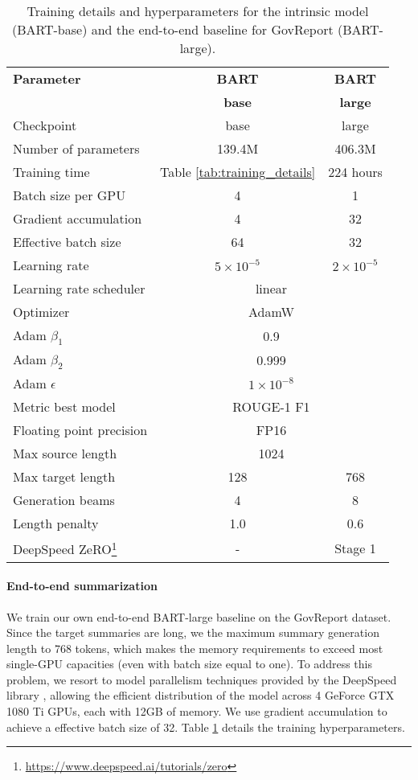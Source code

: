 \documentclass[11pt,table]{article}
\begin{document}
\begin{table}
  \centering
  \setlength\tabcolsep{2.9pt}
  \begin{tabular}{lcc}
    \toprule
    \textbf{Parameter} & \textbf{BART} & \textbf{BART} \\
     & \textbf{base} & \textbf{large} \\
    \midrule
    Checkpoint & base & large \\
    Number of parameters & 139.4M & 406.3M \\
    Training time & Table \ref{tab:training_details} & 224 hours \\
    Batch size per GPU & 4 & 1 \\
    Gradient accumulation & 4 & 32 \\
    Effective batch size & 64 & 32 \\
    Learning rate & $5 \times 10^{-5}$ & $2 \times 10^{-5}$ \\
    Learning rate scheduler & \multicolumn{2}{c}{linear} \\
    Optimizer & \multicolumn{2}{c}{AdamW} \\
    Adam $\beta_1$ & \multicolumn{2}{c}{0.9} \\
    Adam $\beta_2$ & \multicolumn{2}{c}{0.999} \\
    Adam $\epsilon$ & \multicolumn{2}{c}{$1 \times 10^{-8}$} \\
    Metric best model & \multicolumn{2}{c}{ROUGE-1 F1} \\
    Floating point precision & \multicolumn{2}{c}{FP16} \\
    Max source length & \multicolumn{2}{c}{1024} \\
    Max target length & 128 & 768 \\
    Generation beams & 4 & 8 \\
    Length penalty & 1.0 & 0.6 \\  
    DeepSpeed ZeRO\footnote{\url{https://www.deepspeed.ai/tutorials/zero}} & - & Stage 1 \\
    \bottomrule
  \end{tabular}
  \caption{Training details and  hyperparameters for the intrinsic model (BART-base) and the end-to-end baseline for GovReport (BART-large).}
  \label{tab:training_parameters}
\end{table}

\paragraph{End-to-end summarization}
We train our own end-to-end BART-large baseline on the GovReport dataset. Since the target summaries are long, we the maximum summary generation length to 768 tokens, which makes the memory requirements to exceed most single-GPU capacities (even with batch size equal to one). To address this problem, we resort to model parallelism techniques provided by the DeepSpeed library \cite{rajbhandari2019zero}, allowing the efficient distribution of the model across 4 GeForce GTX 1080 Ti GPUs, each with 12GB of memory. We use gradient accumulation to achieve a effective batch size of 32. Table \ref{tab:training_parameters} details the training hyperparameters.
\end{document}
